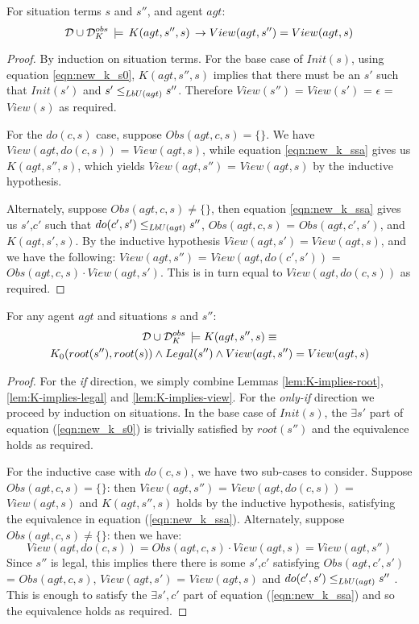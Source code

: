 \begin{lemma}
\label{lem:K-implies-view}For situation terms $s$ and $s''$, and
agent $agt$:\[
\mathcal{D}\cup\mathcal{D}_{K}^{obs}\,\models\, K(agt,s'',s)\,\rightarrow View(agt,s'')=View(agt,s)\]

\end{lemma}
\begin{proof}
By induction on situation terms. For the base case of $Init(s)$,
using equation \eqref{eqn:new_k_s0}, $K(agt,s'',s)$ implies that
there must be an $s'$ such that $Init(s')$ and $s'\leq_{LbU(agt)}s''$.
Therefore $View(s'')$ = $View(s')$ = $\epsilon$ = $View(s)$ as
required.

For the $do(c,s)$ case, suppose $Obs(agt,c,s)=\{\}$. We have $View(agt,do(c,s))$
= $View(agt,s)$, while equation \eqref{eqn:new_k_ssa} gives us $K(agt,s'',s)$,
which yields $View(agt,s'')$ = $View(agt,s)$ by the inductive hypothesis.

Alternately, suppose $Obs(agt,c,s)\neq\{\}$, then equation \eqref{eqn:new_k_ssa}
gives us $s'$,$c'$ such that $do(c',s')\leq_{LbU(agt)}s''$, $Obs(agt,c,s)$
= $Obs(agt,c',s')$, and $K(agt,s',s)$. By the inductive hypothesis
$View(agt,s')=View(agt,s)$, and we have the following: $View(agt,s'')$
= $View(agt,do(c',s'))$ = $Obs(agt,c,s)\cdot View(agt,s')$. This
is in turn equal to $View(agt,do(c,s))$ as required. 
\end{proof}
\medskip{}


\begin{thmext}
[\ref{thm:k_obs_equiv}] For any agent $agt$ and situations
$s$ and $s''$:\begin{multline*}
\mathcal{D}\cup\mathcal{D}_{K}^{obs}\,\models K(agt,s'',s)\equiv\\
K_{0}(root(s''),root(s))\wedge Legal(s'')\wedge View(agt,s'')=View(agt,s)\end{multline*}

\end{thmext}
\begin{proof}
For the \emph{if} direction, we simply combine Lemmas \ref{lem:K-implies-root},
\ref{lem:K-implies-legal} and \ref{lem:K-implies-view}. For the
\emph{only-if} direction we proceed by induction on situations. In
the base case of $Init(s)$, the $\exists s'$ part of equation (\ref{eqn:new_k_s0})
is trivially satisfied by $root(s'')$ and the equivalence holds as
required.

For the inductive case with $do(c,s)$, we have two sub-cases to consider.
Suppose $Obs(agt,c,s)=\{\}$: then $View(agt,s'')$ = $View(agt,do(c,s))$
= $View(agt,s)$ and $K(agt,s'',s)$ holds by the inductive hypothesis,
satisfying the equivalence in equation (\ref{eqn:new_k_ssa}). Alternately,
suppose $Obs(agt,c,s)\neq\{\}$: then we have:\[
View(agt,do(c,s))=Obs(agt,c,s)\cdot View(agt,s)=View(agt,s'')\]
 Since $s''$ is legal, this implies there there is some $s'$,$c'$
satisfying $Obs(agt,c',s')$ = $Obs(agt,c,s)$, $View(agt,s')$ =
$View(agt,s)$ and $do(c',s')\leq_{LbU(agt)}s''$ . This is enough
to satisfy the $\exists s',c'$ part of equation (\ref{eqn:new_k_ssa})
and so the equivalence holds as required. 
\end{proof}
\medskip{}


